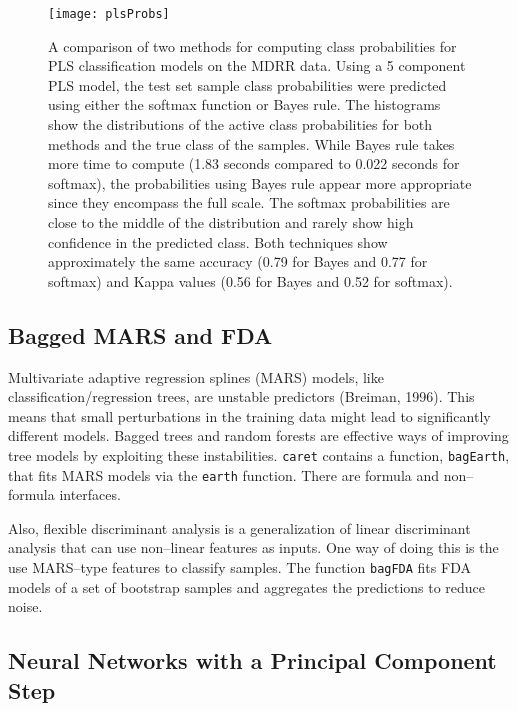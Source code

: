 \documentclass[12pt]{article}
\begin{document}
\begin{figure}
   \begin{center}		
      \texttt{[image: plsProbs]}
\caption{A comparison of two methods for computing class probabilities for PLS classification models on the MDRR data. Using a 5 component PLS model, the test set sample class probabilities were predicted using either the softmax function or Bayes rule. The histograms show the distributions of the active class probabilities for both methods and the true class of the samples. While Bayes rule takes more time to compute (1.83 seconds compared to 0.022 seconds for softmax), the probabilities using Bayes rule appear more appropriate since they encompass the full scale. The softmax probabilities are close to the middle of the distribution and rarely show high confidence in the predicted class. Both techniques show approximately the same accuracy (0.79 for Bayes and 0.77 for softmax) and Kappa values (0.56 for Bayes and 0.52 for softmax).}
      \label{f:plsProbs}       
   \end{center}
\end{figure}  

\subsection{Bagged MARS and FDA}

Multivariate adaptive regression splines (MARS) models, like classification/regression trees, are unstable predictors (Breiman, 1996). This means that small perturbations in the training data might lead to significantly different models. Bagged trees and random forests are effective ways of improving tree models by exploiting these instabilities. \texttt{caret} contains a function, \texttt{bagEarth}, that fits MARS models via the \texttt{earth} function. There are formula and non--formula interfaces. 

Also, flexible discriminant analysis is a generalization of linear discriminant analysis that can use non--linear features as inputs. One way of doing this is the use MARS--type features to classify samples. The function \texttt{bagFDA} fits FDA models of a set of bootstrap samples and aggregates the predictions to reduce noise.  

\subsection{Neural Networks with a Principal Component Step}
\end{document}

